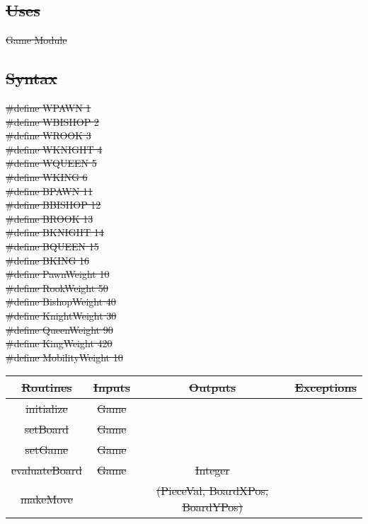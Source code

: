 \documentclass[12pt, titlepage]{article}
\begin{document}
    \subsection*{\sout{Uses}}
        \sout{Game Module}
    
    \subsection*{\sout{Syntax}}
        \sout{\#define WPAWN 1\\
        \#define WBISHOP 2\\
        \#define WROOK 3\\
        \#define WKNIGHT 4\\
        \#define WQUEEN 5\\
        \#define WKING 6\\
        \#define BPAWN 11\\
        \#define BBISHOP 12\\
        \#define BROOK 13\\
        \#define BKNIGHT 14\\
        \#define BQUEEN 15\\
        \#define BKING 16\\
        \#define PawnWeight 10\\
        \#define RookWeight 50\\
        \#define BishopWeight 40\\
        \#define KnightWeight 30\\
        \#define QueenWeight 90\\
        \#define KingWeight 420\\
        \#define MobilityWeight 10\\}
        \begin{center}
            \begin{tabular}{|c|c|c|c|} 
                \hline
                \sout{Routines} & \sout{Inputs} & \sout{Outputs} & \sout{Exceptions} \\
                \hline
                \sout{initialize} & \sout{Game} & &\\
                \hline
                \sout{setBoard} & \sout{Game} & &  \\ 
                \hline
                \sout{setGame} & \sout{Game} &  & \\
                \hline
                \sout{evaluateBoard} & \sout{Game} & \sout{Integer} & \\
                \hline
                \sout{makeMove} & & \sout{(PieceVal, BoardXPos, BoardYPos)} & \\
                \hline
            \end{tabular}
        \end{center}
    
\end{document}
